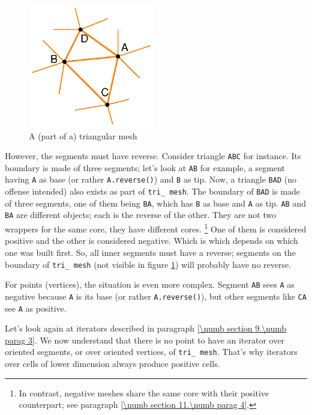 \begin{figure}[ht] \centering
  \includegraphics[width=55mm]{malha-tri}
  \caption{A (part of a) triangular mesh}
  \label{\numb section 9.\numb fig 2}
\end{figure}

However, the segments must have reverse.
Consider triangle {\small\tt ABC} for instance.
Its boundary is made of three segments; let's look at {\small\tt AB} for example,
a segment having {\small\tt A} as base (or rather {\small\tt A.reverse()}) and
{\small\tt B} as tip.
Now, a triangle {\small\tt BAD} (no offense intended) also exists as part of
{\small\tt tri\_\,mesh}.
The boundary of {\small\tt BAD} is made of three segments, one of them being {\small\tt BA},
which has {\small\tt B} as base and {\small\tt A} as tip.
{\small\tt AB} and {\small\tt BA} are different {\small\tt {}} objects;
each is the reverse of the other.
They are not two wrappers for the same core, they have different cores.%
\footnote {In contrast, negative meshes share the same core with their positive
counterpart; see paragraph \ref{\numb section 11.\numb parag 4}.}
One of them is considered positive and the other is considered negative.
Which is which depends on which one was built first.
So, all inner segments must have a reverse;
segments on the boundary of {\small\tt tri\_\,mesh} (not visible in figure
\ref{\numb section 9.\numb fig 2}) will probably have no reverse.

For points (vertices), the situation is even more complex.
Segment {\small\tt AB} sees {\small\tt A} as negative because {\small\tt A} is its base
(or rather {\small\tt A.reverse()}),
but other segments like {\small\tt CA} see {\small\tt A} as positive.

Let's look again at iterators described in paragraph \ref{\numb section 9.\numb parag 3}.
We now understand that there is no point to have an iterator over oriented
segments, or over oriented vertices, of {\small\tt tri\_\,mesh}.
That's why iterators over cells of lower dimension always produce positive cells.

